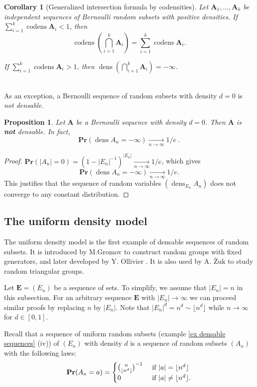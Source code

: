 \documentclass{article}
\DeclareMathOperator{\dens}{dens}
\DeclareMathOperator{\codens}{codens}
\newcommand{\moinsun}{^{-1}}
\newcommand{\bs}{\boldsymbol}
\newcommand{\tendvers}{\xrightarrow[n\to\infty]{}}
\def\Pr{\mathbf{Pr}}
\newcommand\flr[1]{\lfloor #1 \rfloor}
\newtheorem{prop}[thm]{Proposition}
\newtheorem{cor}[thm]{Corollary}
\theoremstyle{remark}
\begin{document}
\begin{cor}[Generalized intersection formula by codensities] Let $\bs A_1, \dots, \bs A_k$ be independent sequences of Bernoulli random subsets with positive densities. If $\displaystyle{\sum_{i=1}^k\codens \bs A_i<1}$, then
\[\codens\left(\bigcap_{i=1}^k \bs A_i\right) = \sum_{i=1}^k\codens \bs A_i.\]

If $\displaystyle{\sum_{i=1}^k\codens \bs A_i > 1}$, then $\dens\left(\bigcap_{i=1}^k \bs A_i\right) = -\infty$.
\end{cor}\quad\\

As an exception, a Bernoulli sequence of random subsets with density $d = 0$ is \textit{not densable}.

\begin{prop}\label{dens0Bernoulli} Let $\bs A$ be a Bernoulli sequence with density $d = 0$. Then $\bs A$ is \textbf{not} densable. In fact,
\[\Pr(\dens A_n = -\infty) \tendvers 1/e\; .\]
\end{prop}
\begin{proof}
$\Pr(|A_n|=0)=(1-|E_n|\moinsun)^{|E_n|}\tendvers 1/e$, which gives
\[\Pr(\dens A_n = -\infty) \tendvers 1/e.\]
This justifies that the sequence of random variables $(\dens_{E_n} A_n)$ does not converge to any constant distribution.
\end{proof}
\subsection{The uniform density model}

The uniform density model is the first example of densable sequences of random subsets. It is introduced by M.Gromov \cite{Gro93} to construct random groups with fixed generators, and later developed by Y. Ollivier \cite{Oll05}. It is also used by A. \.Zuk \cite{Zuk03} to study random triangular groups.

Let $\bs E = (E_n)$ be a sequence of sets. To simplify, we assume that $|E_n|=n$ in this subsection. For an arbitrary sequence $\bs E$ with $|E_n|\to\infty$ we can proceed similar proofs by replacing $n$ by $|E_n|$. Note that $|E_n|^d = n^d\sim\lfloor n^d\rfloor$ while $n\to\infty$ for $d\in [0,1]$. 

Recall that a sequence of uniform random subsets (example \ref{ex densable sequences} (iv)) of $(E_n)$ with density $d$ is a sequence of random subsets $(A_n)$ with the following laws:
    \[\Pr(A_n=a)=\begin{cases}
    \binom{n}{\flr{n^d}}\moinsun & \textup{ if } |a| = \lfloor n^d\rfloor \\
    0 & \textup{ if } |a| \neq \lfloor n^d\rfloor.
    \end{cases}\] 
\end{document}
